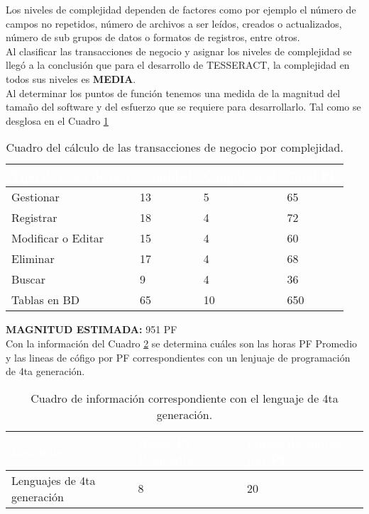 Los niveles de complejidad dependen de factores como por ejemplo el número de campos no repetidos, número de archivos a ser leídos, creados o actualizados, número de sub grupos de datos o formatos de registros, entre otros.\\

Al clasificar las transacciones de negocio y asignar los niveles de complejidad se llegó a la conclusión que para el desarrollo de TESSERACT, la complejidad en todos sus niveles es \textbf {MEDIA}.\\

Al determinar los puntos de función tenemos una medida de la magnitud del tamaño del software y del esfuerzo que se requiere para desarrollarlo. Tal como se desglosa en el Cuadro \ref{tbl:complejidad}

\begin{table}[H]
	\centering
	\begin{tabular}{|p{4cm}|p{3cm}|p{3cm}|p{3cm}|}
		\hline
		\rowcolor{black} \textcolor{white} {\textbf{Tipo de Caso de uso}} & \textcolor{white}{\textbf{Cantidad}} & \textcolor{white}{\textbf{Complejidad}} & \textcolor{white}{\textbf{Total PF}} \\ 
		\hline
		Gestionar & 13  &  5 &  65  \\
		\hline
		Registrar & 18 &  4 &  72 \\
		\hline
		Modificar o Editar & 15 &  4 &  60  \\
		\hline
		Eliminar & 17 &  4 &  68  \\
		\hline
		Buscar & 9 &  4 &  36 \\
		\hline
		Tablas en BD & 65 &  10 &  650 \\
		\hline
	\end{tabular}
\caption{Cuadro del cálculo de las transacciones de negocio por complejidad.}
\label{tbl:complejidad}
\end{table}

\textbf {MAGNITUD ESTIMADA:} 951 PF\\

Con la información del Cuadro \ref{tbl:leng} se determina cuáles son las horas PF Promedio y las lineas de cófigo por PF correspondientes con un lenjuaje de programación de 4ta generación.\\

\begin{table}[H]
	\centering
	\begin{tabular}{|p{5cm}|p{3cm}|p{3cm}|}
		\hline
		\rowcolor{black} \textcolor{white} {\textbf{Lenguaje}} & \textcolor{white}{\textbf{Horas PF Promedio}} & \textcolor{white}{\textbf{Lineas de código por PF}} \\ \hline
		Lenguajes de 4ta generación & 8  & 20 \\
		\hline
	\end{tabular}
\caption{Cuadro de información correspondiente con el lenguaje de 4ta generación.}
\label{tbl:leng}
\end{table}

